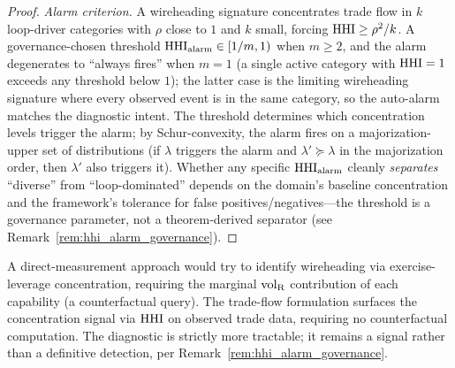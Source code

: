 \begin{proof}
\emph{Alarm criterion.}
A wireheading signature concentrates trade flow in $k$
loop-driver categories with $\rho$ close to $1$ and $k$ small,
forcing $\mathrm{HHI} \geq \rho^2/k$.  A governance-chosen threshold
$\mathrm{HHI}_{\mathrm{alarm}} \in [1/m, 1)$ when $m \geq 2$, and the
alarm degenerates to ``always fires'' when $m = 1$ (a single
active category with $\mathrm{HHI} = 1$ exceeds any threshold below
$1$); the latter case is the limiting wireheading signature
where every observed event is in the same category, so the
auto-alarm matches the diagnostic intent.  The threshold
determines which concentration levels trigger the alarm; by Schur-convexity, the
alarm fires on a majorization-upper set of distributions (if
$\lambda$ triggers the alarm and $\lambda' \succeq \lambda$ in
the majorization order, then $\lambda'$ also triggers it).
Whether any specific $\mathrm{HHI}_{\mathrm{alarm}}$ cleanly
\emph{separates} ``diverse'' from ``loop-dominated'' depends on
the domain's baseline concentration and the framework's
tolerance for false positives/negatives---the threshold is a
governance parameter, not a theorem-derived separator (see
Remark~\ref{rem:hhi_alarm_governance}).
\end{proof}

\begin{remark}
A direct-measurement approach would try to identify wireheading
via exercise-leverage concentration, requiring the marginal
${\operatorname{vol}_{\mathrm{R}}}$ contribution of each capability (a counterfactual query).
The trade-flow formulation surfaces the concentration signal via
$\mathrm{HHI}$ on observed trade data, requiring no counterfactual
computation.  The diagnostic is strictly more tractable; it
remains a signal rather than a definitive detection, per
Remark~\ref{rem:hhi_alarm_governance}.
\end{remark}

